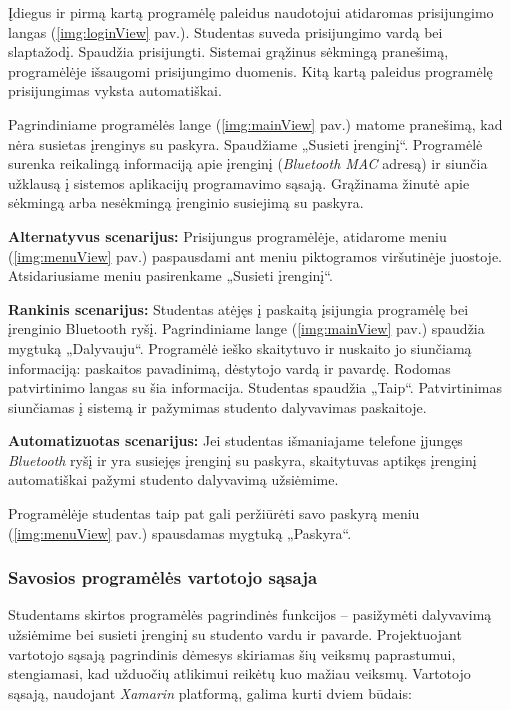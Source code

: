 \documentclass{VUMIFPSkursinis}
\begin{document}

Įdiegus ir pirmą kartą programėlę paleidus naudotojui atidaromas prisijungimo langas (\ref{img:loginView} pav.). Studentas suveda prisijungimo vardą bei slaptažodį. Spaudžia prisijungti. Sistemai grąžinus sėkmingą pranešimą, programėlėje išsaugomi prisijungimo duomenis. Kitą kartą paleidus programėlę prisijungimas vyksta automatiškai.


Pagrindiniame programėlės lange (\ref{img:mainView} pav.) matome pranešimą, kad nėra susietas įrenginys su paskyra. Spaudžiame „Susieti įrenginį“. Programėlė surenka reikalingą informaciją apie įrenginį (\textit{Bluetooth MAC} adresą) ir siunčia užklausą į sistemos aplikacijų programavimo sąsają. Grąžinama žinutė apie sėkmingą arba nesėkmingą įrenginio susiejimą su paskyra.

\textbf{Alternatyvus scenarijus:} Prisijungus programėlėje, atidarome meniu (\ref{img:menuView} pav.) paspausdami ant meniu piktogramos viršutinėje juostoje. Atsidariusiame meniu pasirenkame „Susieti įrenginį“.


\textbf{Rankinis scenarijus:} Studentas atėjęs į paskaitą įsijungia programėlę bei įrenginio Bluetooth ryšį. Pagrindiniame lange (\ref{img:mainView} pav.) spaudžia mygtuką „Dalyvauju“. Programėlė ieško skaitytuvo ir nuskaito jo siunčiamą informaciją: paskaitos pavadinimą, dėstytojo vardą ir pavardę. Rodomas patvirtinimo langas su šia informacija. Studentas spaudžia „Taip“. Patvirtinimas siunčiamas į sistemą ir pažymimas studento dalyvavimas paskaitoje.

\textbf{Automatizuotas scenarijus:} Jei studentas išmaniajame telefone įjungęs \textit{Bluetooth} ryšį ir yra susiejęs įrenginį su paskyra, skaitytuvas aptikęs įrenginį automatiškai pažymi studento dalyvavimą užsiėmime.


Programėlėje studentas taip pat gali peržiūrėti savo paskyrą meniu (\ref{img:menuView} pav.) spausdamas mygtuką „Paskyra“.

\subsubsection{Savosios programėlės vartotojo sąsaja}

Studentams skirtos programėlės pagrindinės funkcijos – pasižymėti dalyvavimą užsiėmime bei susieti įrenginį su studento vardu ir pavarde. Projektuojant vartotojo sąsają pagrindinis dėmesys skiriamas šių veiksmų paprastumui, stengiamasi, kad užduočių atlikimui reikėtų kuo mažiau veiksmų. Vartotojo sąsają, naudojant \textit{Xamarin} platformą, galima kurti dviem būdais:
\end{document}

